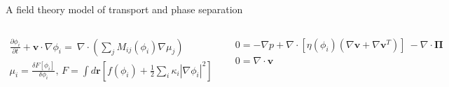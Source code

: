 \documentclass[aspectratio=169]{beamer}
\begin{document}
\begin{frame}[t]{A field theory model of transport and phase separation}
\begin{columns}[T]

      \centering


      \vspace{-18pt}
      \begin{gather*}
      \frac{\partial \phi_{i}}{\partial t} + \bm{v} \cdot \nabla \phi_{i}  = \
             \nabla \cdot \left ( \sum_{j} M_{ij}(\phi_{i}) \nabla \mu_{j} \right ) \\
        \mu_{i} = \frac{\delta F[\phi_{i}]}{\delta \phi_{i}}, \,
          F = \int d\bm{r} \left [ f(\phi_{i}) + 
              \frac{1}{2} \sum_{i} \kappa_{i} \left | \nabla \phi_{i} \right | ^{2} \right ]
      \end{gather*} \par

      \begin{gather*}
        0 = -\nabla p + \nabla \cdot \left [ \eta(\phi_{i}) (\nabla \bm{v} + \nabla \bm{v}^{T}) \right ] \
            - \nabla \cdot \bm{\Pi} \\[3pt]
        0 = \nabla \cdot \bm{v}
      \end{gather*} \par


    \end{columns}

\end{frame}
\end{document}
